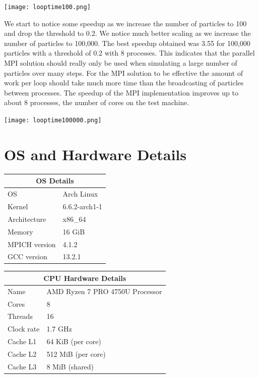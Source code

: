 \documentclass{article}
\begin{document}
\begin{center}
  \texttt{[image: looptime100.png]}
\end{center}

We start to notice some speedup as we increase the number of particles to 100
and drop the threshold to 0.2.
We notice much better scaling as we increase the number of particles to
100,000.
The best speedup obtained was 3.55 for 100,000 particles with a threshold of
0.2 with 8 processes.
This indicates that the parallel MPI solution should really only be used when
simulating a large number of particles over many steps.
For the MPI solution to be effective the amount of work per loop should take
much more time than the broadcasting of particles between processes.
The speedup of the MPI implementation improves up to about 8 processes, the
number of cores on the test machine.

\begin{center}
  \texttt{[image: looptime100000.png]}
\end{center}

\section{OS and Hardware Details}

\begin{center}
\begin{tabular}{|l|l|}
  \hline
  \multicolumn{2}{|c|}{\bf OS Details} \\ \hline
  OS & Arch Linux        \\ \hline
  Kernel & 6.6.2-arch1-1 \\ \hline
  Architecture & x86\_64 \\ \hline
  Memory & 16 GiB        \\ \hline
  MPICH version & 4.1.2  \\ \hline
  GCC version & 13.2.1  \\ \hline
\end{tabular}
\end{center}

\begin{center}
\begin{tabular}{|l|l|}
  \hline
  \multicolumn{2}{|c|}{\bf CPU Hardware Details} \\ \hline
  Name & AMD Ryzen 7 PRO 4750U Processor \\ \hline
  Cores & 8                                   \\ \hline
  Threads & 16                                \\ \hline
  Clock rate & 1.7 GHz                        \\ \hline
  Cache L1 & 64 KiB (per core)                 \\ \hline
  Cache L2 & 512 MiB (per core)                \\ \hline
  Cache L3 & 8 MiB (shared)                    \\ \hline
\end{tabular}
\end{center}
\end{document}
